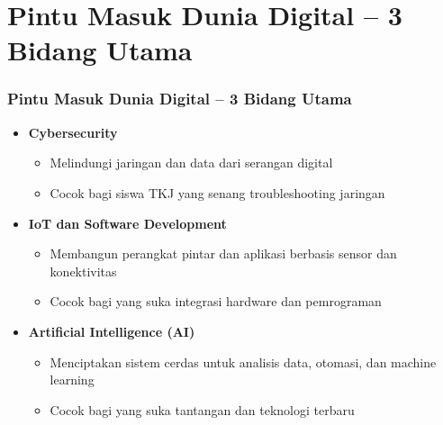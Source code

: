 \documentclass[aspectratio=169, table]{beamer}
\begin{document}
\section{Pintu Masuk Dunia Digital – 3 Bidang Utama}
\begin{frame}
	\frametitle{Pintu Masuk Dunia Digital – 3 Bidang Utama}
	\vspace{10pt}
	\begin{itemize}
		\item \textbf{Cybersecurity}
		\begin{itemize}
			\item Melindungi jaringan dan data dari serangan digital
			\item Cocok bagi siswa TKJ yang senang troubleshooting jaringan
		\end{itemize}
		\item \textbf{IoT dan Software Development}
		\begin{itemize}
			\item Membangun perangkat pintar dan aplikasi berbasis sensor dan konektivitas
			\item Cocok bagi yang suka integrasi hardware dan pemrograman
		\end{itemize}
		\item \textbf{Artificial Intelligence (AI)}
		\begin{itemize}
			\item Menciptakan sistem cerdas untuk analisis data, otomasi, dan machine learning
			\item Cocok bagi yang suka tantangan dan teknologi terbaru
		\end{itemize}
	\end{itemize}
\end{frame}

\end{document}
